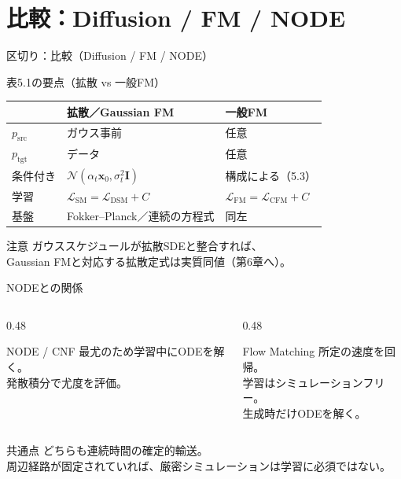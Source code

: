 \section{比較：Diffusion / FM / NODE}
\asmain
\begin{frame}{区切り：比較（Diffusion / FM / NODE）}
    \tableofcontents[currentsection]
\end{frame}
\asmain
\begin{frame}{表5.1の要点（拡散 vs 一般FM）}
    \renewcommand{\arraystretch}{1.15}
    \begin{tabular}{lll}
        \hline
        & 拡散／Gaussian FM & 一般FM \\
        \hline
        $p_{\mathrm{src}}$ & ガウス事前 & 任意 \\
        $p_{\mathrm{tgt}}$ & データ & 任意 \\
        条件付き & $\mathcal{N}(\alpha_t\bm{x}_0,\sigma_t^{2}\bm{I})$ & 構成による（5.3） \\
        学習 & $\mathcal{L}_{\mathrm{SM}}=\mathcal{L}_{\mathrm{DSM}}+C$
            & $\mathcal{L}_{\mathrm{FM}}=\mathcal{L}_{\mathrm{CFM}}+C$ \\
        基盤 & Fokker--Planck／連続の方程式 & 同左 \\
        \hline
    \end{tabular}
    \vspace{0.5em}
    \begin{block}{注意}
        ガウススケジュールが拡散SDEと整合すれば、\\
        Gaussian FMと対応する拡散定式は実質同値（第6章へ）。
    \end{block}
\end{frame}
\asmain
\begin{frame}{NODEとの関係}
    \begin{columns}[T,onlytextwidth]
        \begin{column}{0.48\textwidth}
            \begin{block}{NODE / CNF}
                最尤のため学習中にODEを解く。\\
                発散積分で尤度を評価。
            \end{block}
        \end{column}
        \begin{column}{0.48\textwidth}
            \begin{block}{Flow Matching}
                所定の速度を回帰。\\
                学習はシミュレーションフリー。\\
                生成時だけODEを解く。
            \end{block}
        \end{column}
    \end{columns}
    \vspace{0.4em}
    \begin{block}{共通点}
        どちらも連続時間の確定的輸送。\\
        周辺経路が固定されていれば、厳密シミュレーションは学習に必須ではない。
    \end{block}
\end{frame}
